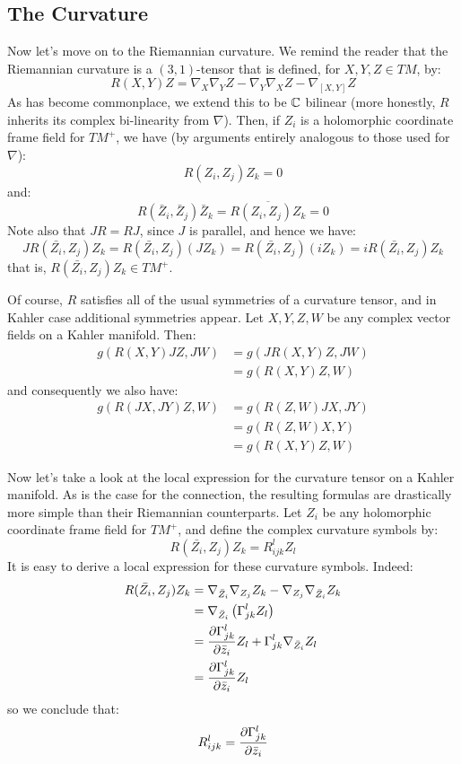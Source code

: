 \subsection{The Curvature}

Now let's move on to the Riemannian curvature.  We remind the reader that the Riemannian curvature is a $(3,1)$-tensor that is defined, for $X,Y,Z \in TM$, by:
%
$$ R(X,Y)Z = \nabla_{X} \nabla_{Y} Z - \nabla_{Y} \nabla_{X} Z - \nabla_{[X,Y]} Z $$
%
As has become commonplace, we extend this to be $\mathbb{C}$ bilinear (more honestly, $R$ inherits its complex bi-linearity from $\nabla$).  Then, if $Z_i$ is a holomorphic coordinate frame field for $TM^{+}$, we have (by arguments entirely analogous to those used for $\nabla$):
%
$$ R(Z_i, Z_j) Z_k = 0 $$
%
and:
%
$$ R( \bar{Z}_i, \bar{Z}_j ) \bar{Z}_k = \overline{ R(Z_i, Z_j ) Z_k } = 0 $$
%
Note also that $JR = RJ$, since $J$ is parallel, and hence we have:
%
$$ J R( \bar{Z_i}, Z_j ) Z_k = R( \bar{Z_i}, Z_j )(J Z_k) = R( \bar{Z_i}, Z_j )( i Z_k) = i R( \bar{Z_i}, Z_j ) Z_k $$
%
that is, $ R( \bar{Z_i}, Z_j ) Z_k \in TM^{+} $.  


Of course, $R$ satisfies all of the usual symmetries of a curvature tensor, and in Kahler case additional symmetries appear.  Let $X,Y,Z,W$ be any complex vector fields on a Kahler manifold.  Then:
%
\begin{align*}
g( R(X,Y) JZ, JW ) &=  g( J R(X,Y) Z, JW ) \\
&= g( R(X,Y) Z, W )
\end{align*}
%
and consequently we also have:
%
\begin{align*}
g( R( JX, JY ) Z, W ) &= g( R(Z, W) JX, JY ) \\
&= g( R( Z, W ) X, Y ) \\
&= g( R(X, Y) Z, W )
\end{align*}

Now let's take a look at the local expression for the curvature tensor on a Kahler manifold.  As is the case for the connection, the resulting formulas are drastically more simple than their Riemannian counterparts.  Let $Z_i$ be any holomorphic coordinate frame field for $TM^{+}$, and define the complex curvature symbols by:
%
$$ R( \bar{Z_i}, Z_j ) Z_k = R_{ijk}^l Z_l $$
%
It is easy to derive a local expression for these curvature symbols.  Indeed:
%
\begin{align*}
R( \bar{Z_i}, Z_j ) Z_k &= \nabla_{ \bar{Z}_i } \nabla_{Z_j} Z_k - \nabla_{ Z_j } \nabla_{ \bar{Z}_i } Z_k \\
&= \nabla_{ \bar{Z}_i } \left( \Gamma_{jk}^l Z_l \right ) \\
&= \frac{ \partial \Gamma_{jk}^l }{ \partial \bar{z}_i } Z_l + \Gamma_{jk}^l \nabla_{ \bar{Z}_i } Z_l \\
&=  \frac{ \partial \Gamma_{jk}^l }{ \partial \bar{z}_i } Z_l
\end{align*}
%
so we conclude that:
%
$$ R_{ijk}^l = \frac{ \partial \Gamma_{jk}^l }{ \partial \bar{z}_i } $$


